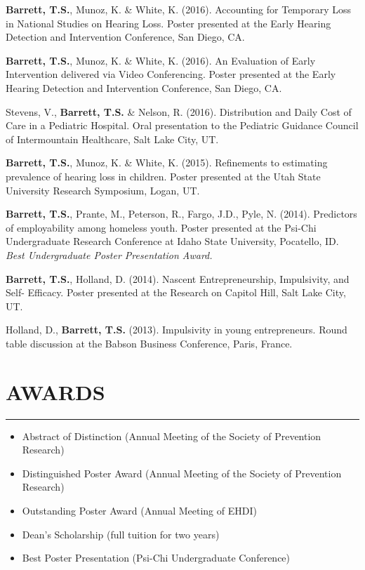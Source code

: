 \documentclass[]{DissertateUSU}
\providecommand{\tightlist}{%
  \setlength{\itemsep}{0pt}\setlength{\parskip}{0pt}}
\begin{document}
\textbf{Barrett, T.S.}, Munoz, K. \& White, K. (2016). Accounting for
Temporary Loss in National Studies on Hearing Loss. Poster presented at
the Early Hearing Detection and Intervention Conference, San Diego, CA.

\textbf{Barrett, T.S.}, Munoz, K. \& White, K. (2016). An Evaluation of
Early Intervention delivered via Video Conferencing. Poster presented at
the Early Hearing Detection and Intervention Conference, San Diego, CA.

Stevens, V., \textbf{Barrett, T.S.} \& Nelson, R. (2016). Distribution
and Daily Cost of Care in a Pediatric Hospital. Oral presentation to the
Pediatric Guidance Council of Intermountain Healthcare, Salt Lake City,
UT.

\textbf{Barrett, T.S.}, Munoz, K. \& White, K. (2015). Refinements to
estimating prevalence of hearing loss in children. Poster presented at
the Utah State University Research Symposium, Logan, UT.

\textbf{Barrett, T.S.}, Prante, M., Peterson, R., Fargo, J.D., Pyle, N.
(2014). Predictors of employability among homeless youth. Poster
presented at the Psi-Chi Undergraduate Research Conference at Idaho
State University, Pocatello, ID. \emph{Best Undergraduate Poster
Presentation Award.}

\textbf{Barrett, T.S.}, Holland, D. (2014). Nascent Entrepreneurship,
Impulsivity, and Self- Efficacy. Poster presented at the Research on
Capitol Hill, Salt Lake City, UT.

Holland, D., \textbf{Barrett, T.S.} (2013). Impulsivity in young
entrepreneurs. Round table discussion at the Babson Business Conference,
Paris, France.

\vspace{20pt} \tocless\section{AWARDS} \vspace{-10pt} \hrule

\begin{itemize}
\tightlist
\item
  Abstract of Distinction (Annual Meeting of the Society of Prevention
  Research)
\item
  Distinguished Poster Award (Annual Meeting of the Society of
  Prevention Research)
\item
  Outstanding Poster Award (Annual Meeting of EHDI)
\item
  Dean's Scholarship (full tuition for two years)
\item
  Best Poster Presentation (Psi-Chi Undergraduate Conference)
\end{itemize}
\end{document}
